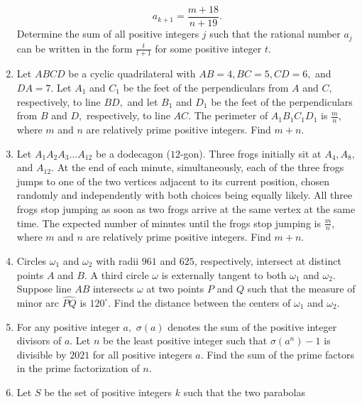 \documentclass{article}
\begin{document}
\begin{enumerate}[label=\arabic*., itemsep=0.5em]
\begin{equation*}
a_{k+1} = \frac{m + 18}{n+19}.
\end{equation*}
Determine the sum of all positive integers \(j\) such that the rational number \(a_j\) can be written in the form \(\frac{t}{t+1}\) for some positive integer \(t\).\par \vspace{0.5em}\item Let \(ABCD\) be a cyclic quadrilateral with \(AB=4,BC=5,CD=6,\) and \(DA=7.\) Let \(A_1\) and \(C_1\) be the feet of the perpendiculars from \(A\) and \(C,\) respectively, to line \(BD,\) and let \(B_1\) and \(D_1\) be the feet of the perpendiculars from \(B\) and \(D,\) respectively, to line \(AC.\) The perimeter of \(A_1B_1C_1D_1\) is \(\frac mn,\) where \(m\) and \(n\) are relatively prime positive integers. Find \(m+n.\)\par \vspace{0.5em}\item Let \(A_1A_2A_3\ldots A_{12}\) be a dodecagon (\(12\)-gon). Three frogs initially sit at \(A_4,A_8,\) and \(A_{12}\). At the end of each minute, simultaneously, each of the three frogs jumps to one of the two vertices adjacent to its current position, chosen randomly and independently with both choices being equally likely. All three frogs stop jumping as soon as two frogs arrive at the same vertex at the same time. The expected number of minutes until the frogs stop jumping is \(\frac mn\), where \(m\) and \(n\) are relatively prime positive integers. Find \(m+n\).\par \vspace{0.5em}\item Circles \(\omega_1\) and \(\omega_2\) with radii \(961\) and \(625\), respectively, intersect at distinct points \(A\) and \(B\). A third circle \(\omega\) is externally tangent to both \(\omega_1\) and \(\omega_2\). Suppose line \(AB\) intersects \(\omega\) at two points \(P\) and \(Q\) such that the measure of minor arc \(\widehat{PQ}\) is \(120^{\circ}\). Find the distance between the centers of \(\omega_1\) and \(\omega_2\).\par \vspace{0.5em}\item For any positive integer \(a,\) \(\sigma(a)\) denotes the sum of the positive integer divisors of \(a\). Let \(n\) be the least positive integer such that \(\sigma(a^n)-1\) is divisible by \(2021\) for all positive integers \(a\). Find the sum of the prime factors in the prime factorization of \(n\).\par \vspace{0.5em}\item Let \(S\) be the set of positive integers \(k\) such that the two parabolas

\end{enumerate}
\end{document}
